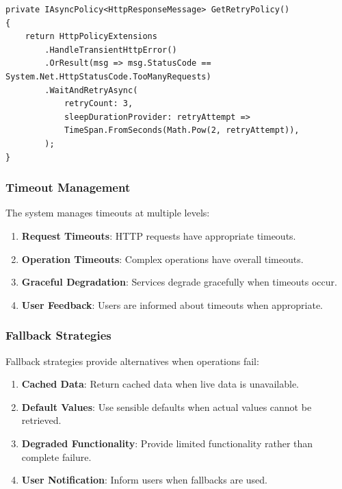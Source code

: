 \begin{verbatim}
private IAsyncPolicy<HttpResponseMessage> GetRetryPolicy()
{
    return HttpPolicyExtensions
        .HandleTransientHttpError()
        .OrResult(msg => msg.StatusCode == System.Net.HttpStatusCode.TooManyRequests)
        .WaitAndRetryAsync(
            retryCount: 3,
            sleepDurationProvider: retryAttempt =>
            TimeSpan.FromSeconds(Math.Pow(2, retryAttempt)),
        );
}
\end{verbatim}

\subsubsection{Timeout Management}

The system manages timeouts at multiple levels:

\begin{enumerate}
   \item \textbf{Request Timeouts}: HTTP requests have appropriate timeouts.
   \item \textbf{Operation Timeouts}: Complex operations have overall timeouts.
   \item \textbf{Graceful Degradation}: Services degrade gracefully when timeouts occur.
   \item \textbf{User Feedback}: Users are informed about timeouts when appropriate.
\end{enumerate}

\subsubsection{Fallback Strategies}

Fallback strategies provide alternatives when operations fail:

\begin{enumerate}
   \item \textbf{Cached Data}: Return cached data when live data is unavailable.
   \item \textbf{Default Values}: Use sensible defaults when actual values cannot be retrieved.
   \item \textbf{Degraded Functionality}: Provide limited functionality rather than complete failure.
   \item \textbf{User Notification}: Inform users when fallbacks are used.
\end{enumerate}


